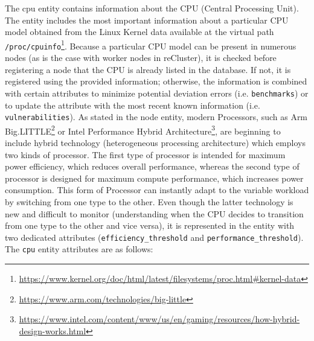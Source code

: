 The cpu entity contains information about the CPU (Central Processing Unit).
\newline
The entity includes the most important information about a particular CPU model obtained
from the Linux Kernel data available at the virtual path \texttt{/proc/cpuinfo}\footnote{\url{https://www.kernel.org/doc/html/latest/filesystems/proc.html\#kernel-data}}.
\newline
Because a particular CPU model can be present in numerous nodes (as is the case with
worker nodes in reCluster), it is checked before registering a node that the CPU
is already listed in the database. If not, it is registered using the provided information;
otherwise, the information is combined with certain attributes to minimize potential
deviation errors (i.e. \texttt{benchmarks}) or to update the attribute with the most
recent known information (i.e. \texttt{vulnerabilities}).
\newline
As stated in the node entity, modern Processors, such as Arm Big.LITTLE\footnote{\url{https://www.arm.com/technologies/big-little}}
or Intel Performance Hybrid Architecture\footnote{\url{https://www.intel.com/content/www/us/en/gaming/resources/how-hybrid-design-works.html}},
are beginning to include hybrid technology (heterogeneous processing
architecture) which employs two kinds of processor. The first type of processor
is intended for maximum power efficiency, which reduces overall performance,
whereas the second type of processor is designed for maximum compute performance,
which increases power consumption. This form of Processor can instantly adapt to
the variable workload by switching from one type to the other\cite{cpu_arm}\cite{cpu_intel}.
Even though the latter technology is new and difficult to monitor (understanding
when the CPU decides to transition from one type to the other and vice versa),
it is represented in the entity with two dedicated attributes (\texttt{efficiency\_threshold}
and \texttt{performance\_threshold}).
\newline
The \texttt{cpu} entity attributes are as follows:

